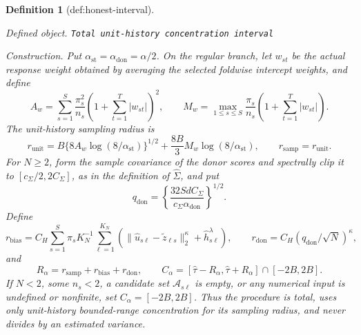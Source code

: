 \documentclass{article}
\newtheorem{definition}{Definition}
\begin{document}
\begin{definition}[def:honest-interval]\label{def:honest-interval}
\par\smallskip\noindent\emph{Defined object.} \texttt{Total unit-\allowbreak{}history concentration interval}
\par\smallskip\noindent\emph{Construction.} Put \(\alpha_{\mathrm{st}}=\alpha_{\mathrm{don}}=\alpha/2\).  On the regular branch, let \(w_{st}\) be the actual response weight obtained by averaging the selected foldwise intercept weights, and define
\[
 A_w=\sum_{s=1}^{S}\frac{\pi_s^2}{n_s}
       \left(1+\sum_{t=1}^{T}|w_{st}|\right)^2,
 \qquad
 M_w=\max_{1\le s\le S}\frac{\pi_s}{n_s}
       \left(1+\sum_{t=1}^{T}|w_{st}|\right).
\]
The unit-history sampling radius is
\[
 r_{\mathrm{unit}}
 =B\{8A_w\log(8/\alpha_{\mathrm{st}})\}^{1/2}
  +\frac{8B}{3}M_w\log(8/\alpha_{\mathrm{st}}),
 \qquad r_{\mathrm{samp}}=r_{\mathrm{unit}}.
\]
For \(N\ge2\), form the sample covariance of the donor scores and spectrally clip it to \([c_\Sigma/2,2C_\Sigma]\), as in the definition of \(\widehat\Sigma\), and put
\[
 q_{\mathrm{don}}
 =\left\{\frac{32SdC_\Sigma}{c_\Sigma\alpha_{\mathrm{don}}}\right\}^{1/2}.
\]
Define
\[
 r_{\mathrm{bias}}
 =C_H\sum_{s=1}^{S}\pi_sK_N^{-1}\sum_{\ell=1}^{K_N}
 \left(\|\widehat u_{s\ell}-\widetilde z_{\ell s}\|_2^\kappa
       +\widehat h_{s\ell}^{\lambda}\right),
 \qquad
 r_{\mathrm{don}}=C_H(q_{\mathrm{don}}/\sqrt N)^\kappa,
\]
and
\[
 R_\alpha=r_{\mathrm{samp}}+r_{\mathrm{bias}}+r_{\mathrm{don}},
 \qquad
 C_\alpha=[\widehat\tau-R_\alpha,\widehat\tau+R_\alpha]\cap[-2B,2B].
\]
If \(N<2\), some \(n_s<2\), a candidate set \(\mathcal A_{s\ell}\) is empty, or any numerical input is undefined or nonfinite, set \(C_\alpha=[-2B,2B]\).  Thus the procedure is total, uses only unit-history bounded-range concentration for its sampling radius, and never divides by an estimated variance.
\end{definition}
\end{document}
